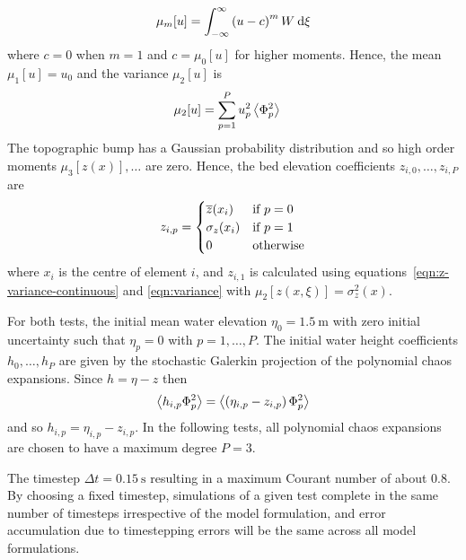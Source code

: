\begin{align}
    \mu_m [u] = \int_{-\infty}^\infty \left(u - c\right)^m W \:\mathrm{d} \xi
\end{align}
where $c = 0$ when $m = 1$ and $c = \mu_0[u]$ for higher moments.
Hence, the mean $\mu_1[u] = u_0$ and the variance $\mu_2[u]$ is
\begin{align}
    \mu_2[u] &= \sum_{p=1}^P u^2_p \left\langle \Phi_p^2 \right\rangle \label{eqn:variance}
\end{align}
The topographic bump has a Gaussian probability distribution and so high order moments $\mu_3[z(x)], \ldots$ are zero.
Hence, the bed elevation coefficients $z_{i,0}, \ldots, z_{i,P}$ are
\begin{align}
    z_{i,p} = \begin{cases}
    \overline{z}(x_i) & \text{if $p=0$} \\
    \sigma_z(x_i) & \text{if $p=1$} \\
    0 & \text{otherwise}
    \end{cases}
    \label{eqn:z-pc-coeffs}
\end{align}
where $x_i$ is the centre of element $i$, and $z_{i,1}$ is calculated using equations~\eqref{eqn:z-variance-continuous} and \eqref{eqn:variance} with $\mu_2[z(x, \xi)] = \sigma_z^2(x)$.

For both tests, the initial mean water elevation $\eta_{0} = \SI{1.5}{\meter}$ with zero initial uncertainty such that $\eta_p = 0$ with $p = 1, \ldots, P$.
The initial water height coefficients $h_0, \ldots, h_P$ are given by the stochastic Galerkin projection of the polynomial chaos expansions.  Since $h = \eta - z$ then
\begin{align}
    \left\langle  h_{i,p} \Phi_p^2 \right\rangle = \left\langle \left(\eta_{i,p} - z_{i,p}\right) \Phi_p^2 \right\rangle
\end{align}
and so $h_{i,p} = \eta_{i,p} - z_{i,p}$.
In the following tests, all polynomial chaos expansions are chosen to have a maximum degree $P = 3$.

The timestep $\Delta t = \SI{0.15}{\second}$ resulting in a maximum Courant number of about $0.8$.  By choosing a fixed timestep, simulations of a given test complete in the same number of timesteps irrespective of the model formulation, and error accumulation due to timestepping errors will be the same across all model formulations.




